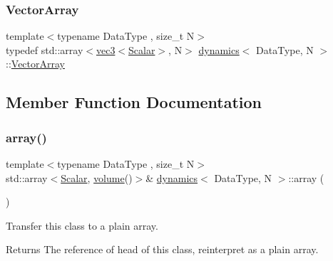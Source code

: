 \mbox{\label{classdynamics_a41e25703d6668a66d96a1db3dc5df03b}} 
\subsubsection{\texorpdfstring{Vector\+Array}{VectorArray}}
{\footnotesize\ttfamily template$<$typename Data\+Type , size\+\_\+t N$>$ \\
typedef std\+::array$<$\mbox{\hyperlink{structvec3}{vec3}}$<$\mbox{\hyperlink{classdynamics_a444c7534e86115117798563cb0e43cde}{Scalar}}$>$, N$>$ \mbox{\hyperlink{classdynamics}{dynamics}}$<$ Data\+Type, N $>$\+::\mbox{\hyperlink{classdynamics_a41e25703d6668a66d96a1db3dc5df03b}{Vector\+Array}}}



\subsection{Member Function Documentation}
\mbox{\label{classdynamics_add2d27f86c6f415999e9e7dd05cc8025}} 
\subsubsection{\texorpdfstring{array()}{array()}}
{\footnotesize\ttfamily template$<$typename Data\+Type , size\+\_\+t N$>$ \\
std\+::array$<$\mbox{\hyperlink{classdynamics_a444c7534e86115117798563cb0e43cde}{Scalar}}, \mbox{\hyperlink{classdynamics_ada4a2418d86de3072e1a238a95e6bdb2}{volume}}()$>$\& \mbox{\hyperlink{classdynamics}{dynamics}}$<$ Data\+Type, N $>$\+::array (\begin{DoxyParamCaption}{ }\end{DoxyParamCaption})\hspace{0.3cm}{\ttfamily [inline]}}



Transfer this class to a plain array. 

\begin{DoxyReturn}{Returns}
The reference of head of this class, reinterpret as a plain array. 
\end{DoxyReturn}
\mbox{\label{classdynamics_a4f6f246917f12269d3bd4a428bd40752}} 
